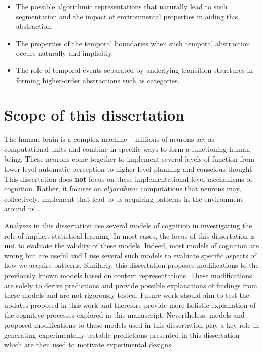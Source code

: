 \begin{itemize}
	\item
	The possible algorithmic representations that naturally lead to such segmentation and the impact of environmental properties in aiding this abstraction.
	\item
	The properties of the temporal boundaries when such temporal abstraction occurs naturally and implicitly.
	\item
	The role of temporal events separated by underlying transition structures in forming higher-order abstractions such as categories.
\end{itemize}

\section{Scope of this dissertation}\label{scope-of-this-dissertation}

The human brain is a complex machine -- millions of neurons act as computational units and combine in specific ways to form a functioning human being. These neurons come together to implement several levels of function from lower-level automatic perception to higher-level planning and conscious thought. This dissertation does \textbf{not} focus on these implementational-level mechanisms of cognition. Rather, it focuses on \emph{algorithmic} computations that neurons may, collectively, implement that lead to us acquiring patterns in the environment around us \parencite{marr1976understanding}. 

Analyses in this dissertation use several models of cognition in investigating the role of implicit statistical learning. In most cases, the focus of this dissertation is \textbf{not} to evaluate the validity of these models. Indeed, most models of cognition are wrong but are useful \parencite{fisher2019all} and I use several such models to evaluate specific aspects of how we acquire patterns. Similarly, this dissertation proposes modifications to the previously known models based on context representations. These modifications are solely to derive predictions and provide possible explanations of findings from these models and are not rigorously tested. Future work should aim to test the updates proposed in this work and therefore provide more holistic explanation of the cognitive processes explored in this manuscript. \ac{Nevertheless, models and proposed modifications to these models used in this dissertation play a key role in generating experimentally testable predictions presented in this dissertation which are then used to motivate experimental designs. }

